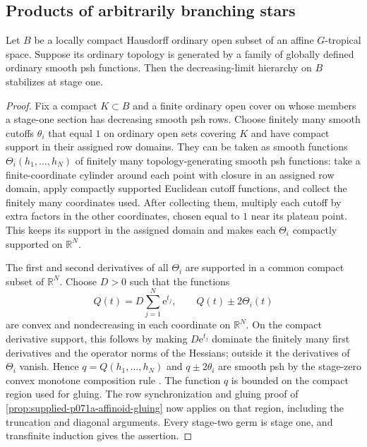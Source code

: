 \subsection{Products of arbitrarily branching stars}
\label{sec:supplied-p071a-arbitrary-star-products}

\begin{proposition}
\label{prop:supplied-p071a-positive-coordinate-criterion}
Let $B$ be a locally compact Hausdorff ordinary open subset of an affine $G$-tropical space. Suppose its ordinary topology is generated by a family of globally defined ordinary smooth psh functions. Then the decreasing-limit hierarchy on $B$ stabilizes at stage one.
\end{proposition}

\begin{proof}
Fix a compact $K\subset B$ and a finite ordinary open cover on whose members a stage-one section has decreasing smooth psh rows. Choose finitely many smooth cutoffs $\theta_i$ that equal $1$ on ordinary open sets covering $K$ and have compact support in their assigned row domains. They can be taken as smooth functions $\Theta_i(h_1,\ldots,h_N)$ of finitely many topology-generating smooth psh functions: take a finite-coordinate cylinder around each point with closure in an assigned row domain, apply compactly supported Euclidean cutoff functions, and collect the finitely many coordinates used. After collecting them, multiply each cutoff by extra factors in the other coordinates, chosen equal to $1$ near its plateau point. This keeps its support in the assigned domain and makes each $\Theta_i$ compactly supported on $\mathbb{R}^N$.

The first and second derivatives of all $\Theta_i$ are supported in a common compact subset of $\mathbb{R}^N$. Choose $D>0$ such that the functions
\[
Q(t)=D\sum_{j=1}^N\mathrm{e}^{t_j},\qquad Q(t)\pm2\Theta_i(t)
\]
are convex and nondecreasing in each coordinate on $\mathbb{R}^N$. On the compact derivative support, this follows by making $D\mathrm{e}^{t_j}$ dominate the finitely many first derivatives and the operator norms of the Hessians; outside it the derivatives of $\Theta_i$ vanish. Hence $q=Q(h_1,\ldots,h_N)$ and $q\pm2\theta_i$ are smooth psh by the stage-zero convex monotone composition rule \cite[Proposition~8.2.1]{CLD25}. The function $q$ is bounded on the compact region used for gluing. The row synchronization and gluing proof of \cref{prop:supplied-p071a-affinoid-gluing} now applies on that region, including the truncation and diagonal arguments. Every stage-two germ is stage one, and transfinite induction gives the assertion.
\end{proof}


